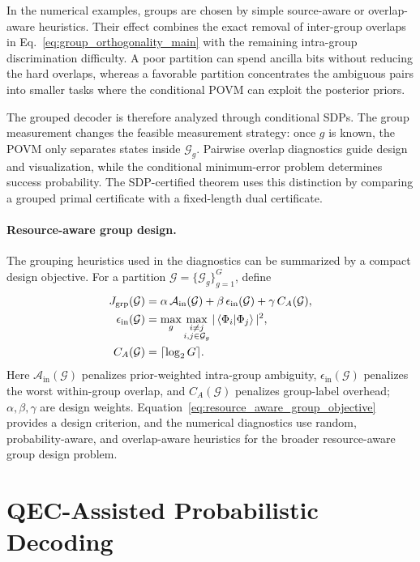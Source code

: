 \documentclass[
 reprint,
 amsmath,amssymb,
 aps,
 pra,
 floatfix,
]{revtex4-2}
\begin{document}
In the numerical examples, groups are chosen by simple source-aware or overlap-aware heuristics. Their effect combines the exact removal of inter-group overlaps in Eq.~\eqref{eq:group_orthogonality_main} with the remaining intra-group discrimination difficulty. A poor partition can spend ancilla bits without reducing the hard overlaps, whereas a favorable partition concentrates the ambiguous pairs into smaller tasks where the conditional POVM can exploit the posterior priors.

The grouped decoder is therefore analyzed through conditional SDPs. The group measurement changes the feasible measurement strategy: once $g$ is known, the POVM only separates states inside $\mathcal G_g$. Pairwise overlap diagnostics guide design and visualization, while the conditional minimum-error problem determines success probability. The SDP-certified theorem uses this distinction by comparing a grouped primal certificate with a fixed-length dual certificate.

\paragraph*{Resource-aware group design.}
The grouping heuristics used in the diagnostics can be summarized by a compact design objective. For a partition \(\mathcal G=\{\mathcal G_g\}_{g=1}^G\), define
\begin{align}
    J_{\mathrm{grp}}(\mathcal G)
    &=
    \alpha\,\mathcal A_{\mathrm{in}}(\mathcal G)
    +
    \beta\,\epsilon_{\mathrm{in}}(\mathcal G)
    +
    \gamma\,C_A(\mathcal G), \nonumber\\
    \epsilon_{\mathrm{in}}(\mathcal G)
    &=
    \max_g\max_{\substack{i\ne j\\ i,j\in\mathcal G_g}}
    |\braket{\Phi_i|\Phi_j}|^2,\nonumber\\
    C_A(\mathcal G)
    &=
    \lceil\log_2G\rceil .
    \label{eq:resource_aware_group_objective}
\end{align}
Here \(\mathcal A_{\mathrm{in}}(\mathcal G)\) penalizes prior-weighted intra-group ambiguity, \(\epsilon_{\mathrm{in}}(\mathcal G)\) penalizes the worst within-group overlap, and \(C_A(\mathcal G)\) penalizes group-label overhead; \(\alpha,\beta,\gamma\) are design weights. Equation~\eqref{eq:resource_aware_group_objective} provides a design criterion, and the numerical diagnostics use random, probability-aware, and overlap-aware heuristics for the broader resource-aware group design problem.

\section{QEC-Assisted Probabilistic Decoding}
\label{sec:qec_prob_decoding}
\end{document}
